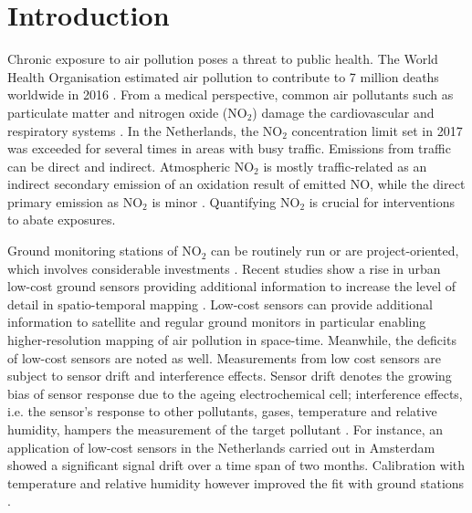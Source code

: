 \documentclass{article}
\begin{document}
\section{Introduction}
Chronic exposure to air pollution poses a threat to public health. The World Health Organisation estimated air pollution to contribute to 7 million deaths worldwide in 2016 \citep{world2018burden}. From a medical perspective, common air pollutants such as particulate matter and nitrogen oxide (NO$_2$) damage the cardiovascular and respiratory systems \citep{anderson2012clearing, pascal2009effets}.  In the Netherlands, the NO$_2$ concentration limit set in 2017 was exceeded for several times in areas with busy traffic\citep{no2}. Emissions from traffic can be direct and indirect. Atmospheric NO$_2$ is mostly traffic-related as an indirect secondary emission of an oxidation result of emitted NO, while the direct primary emission as NO$_2$ is minor \citep{ukno2,no2}. Quantifying NO$_2$ is crucial for interventions to abate exposures.

 Ground monitoring stations of NO$_2$ can be routinely run or are project-oriented, which involves considerable investments \citep{hoek2008review}. Recent studies show a rise in urban low-cost ground sensors providing additional information to increase the level of detail in spatio-temporal mapping \citep{spinelle2015field, schneider2017mapping,isiugo2018assessing}. Low-cost sensors can provide additional information to satellite and regular ground monitors in particular enabling higher-resolution mapping of air pollution in space-time. Meanwhile, the deficits of low-cost sensors are noted as well. Measurements from low cost sensors are subject to sensor drift and interference effects. Sensor drift denotes the growing bias of sensor response due to the ageing electrochemical cell; interference effects, i.e. the sensor's response to other pollutants, gases, temperature and relative humidity, hampers the measurement of the target pollutant \citep{van2019calibration}. For instance, an application of low-cost sensors in the Netherlands carried out in Amsterdam showed a significant signal drift over a time span of two months. Calibration with temperature and relative humidity however improved the fit with ground stations \citep{mijling2018field}. 
 
\end{document}
